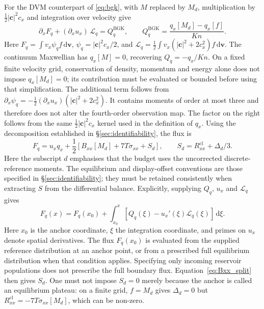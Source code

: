 \documentclass[lineno,paper]{JFM-FLM_Au}
\newenvironment{revision}{\nolinenumbers\begin{tcolorbox}[breakable,colback=revisionyellow,colframe=revisionyellow,boxrule=0pt,arc=0pt,left=5pt,right=5pt,top=5pt,bottom=5pt,before skip=6pt,after skip=6pt]\captionsetup{width=\linewidth}}{\end{tcolorbox}\linenumbers}
\newenvironment{revision}{}{}
\newcommand{\Kn}{\mathit{Kn}}
\newcommand{\dd}{\mathrm{d}}
\newcommand{\cl}{\mathrm{cl}}
\begin{document}
\begin{revision}
For the DVM counterpart of \eqref{eq:bgk}, with $M$ replaced by $M_d$, multiplication by $\frac12|\boldsymbol c|^2c_x$ and integration over velocity give
\begin{equation}
  \partial_x F_q + (\partial_x u_x)\,\mathcal L_q
  =Q_q^{\mathrm{BGK}},
  \qquad
  Q_q^{\mathrm{BGK}}=\frac{q_x[M_d]-q_x[f]}{\Kn} .
  \label{eq:heatbalance_general}
\end{equation}
Here $F_q=\int v_x\psi_q f\,\dd\boldsymbol v$, $\psi_q=|\boldsymbol c|^2c_x/2$, and $\mathcal L_q=\frac12\int v_x(|\boldsymbol c|^2+2c_x^2)f\,\dd\boldsymbol v$. The continuum Maxwellian has $q_x[M]=0$, recovering $Q_q=-q_x/\Kn$. On a fixed finite velocity grid, conservation of density, momentum and energy alone does not impose $q_x[M_d]=0$; its contribution must be evaluated or bounded before using that simplification. The additional term follows from $\partial_x\psi_q=-\frac12(\partial_xu_x)(|\boldsymbol c|^2+2c_x^2)$. It contains moments of order at most three and therefore does not alter the fourth-order observation map. The factor on the right follows from the same $\frac12|\boldsymbol c|^2c_x$ kernel used in the definition of $q_x$. Using the decomposition established in \S\ref{sec:identifiability}, the flux is
\begin{equation}
  F_q=u_xq_x+\frac12\left[B_{xx}[M_d]+7T\sigma_{xx}+S_d\right],
  \qquad S_d=R^{\cl}_{xx}+\Delta_d/3 .
  \label{eq:Bxx_split}
\end{equation}
Here the subscript $d$ emphasises that the budget uses the uncorrected discrete-reference moments. The equilibrium and display-offset conventions are those specified in \S\ref{sec:identifiability}; they must be retained consistently when extracting $S$ from the differential balance.
Explicitly, supplying $Q_q$, $u_x$ and $\mathcal L_q$ gives
\begin{equation}
 F_q(x)=F_q(x_0)+\int_{x_0}^{x}
 \left[Q_q(\xi)-u_x'(\xi)\mathcal L_q(\xi)\right]\,\dd\xi .
 \label{eq:heat_flux_integrated}
\end{equation}
Here $x_0$ is the anchor coordinate, $\xi$ the integration coordinate, and primes on $u_x$ denote spatial derivatives. The flux $F_q(x_0)$ is evaluated from the supplied reference distribution at an anchor point, or from a prescribed full equilibrium distribution when that condition applies. Specifying only incoming reservoir populations does not prescribe the full boundary flux. Equation~\eqref{eq:Bxx_split} then gives $S_d$. One must not impose $S_d=0$ merely because the anchor is called an equilibrium plateau: on a finite grid, $f=M_d$ gives $\Delta_d=0$ but $R^{\cl}_{xx}=-7T\sigma_{xx}[M_d]$, which can be non-zero.

\end{revision}
\end{document}
